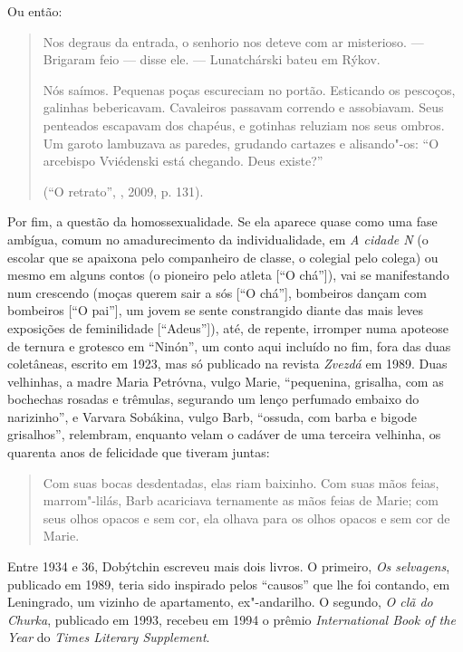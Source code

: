 Ou então:

\begin{quotation}
Nos degraus da entrada, o senhorio nos deteve com ar misterioso.
--- Brigaram feio --- disse ele. --- Lunatchárski bateu em Rýkov.

Nós saímos. Pequenas poças escureciam no portão. Esticando os pescoços,
galinhas bebericavam. Cavaleiros passavam correndo e assobiavam. Seus
penteados escapavam dos chapéus, e gotinhas reluziam nos seus ombros. Um
garoto lambuzava as paredes, grudando cartazes e alisando"-os: ``O
arcebispo Vviédenski está chegando. Deus existe?''

(``O retrato'', , 2009, p. 131).
\end{quotation}

Por fim, a questão da homossexualidade. Se ela aparece quase como uma
fase ambígua, comum no amadurecimento da individualidade, em \emph{A
cidade N} (o escolar que se apaixona pelo companheiro de classe, o
colegial pelo colega) ou mesmo em alguns contos (o pioneiro pelo
atleta [``O chá'']), vai se manifestando num crescendo (moças querem
sair a sós [``O chá''], bombeiros dançam com bombeiros [``O pai''], um
jovem se sente constrangido diante das mais leves exposições de
feminilidade [``Adeus'']), até, de repente, irromper numa apoteose de
ternura e grotesco em ``Ninón'', um conto aqui incluído no fim, fora das
duas coletâneas, escrito em 1923, mas só publicado na revista
\emph{Zvezdá} em 1989. Duas velhinhas, a madre Maria Petróvna, vulgo
Marie, ``pequenina, grisalha, com as bochechas rosadas e trêmulas,
segurando um lenço perfumado embaixo do narizinho'', e Varvara Sobákina,
vulgo Barb, ``ossuda, com barba e bigode grisalhos'', relembram,
enquanto velam o cadáver de uma terceira velhinha, os quarenta anos de
felicidade que tiveram juntas:

\begin{quotation}
Com suas bocas desdentadas, elas riam baixinho. Com suas mãos feias,
marrom"-lilás, Barb acariciava ternamente as mãos feias de Marie; com
seus olhos opacos e sem cor, ela olhava para os olhos opacos e sem cor
de Marie.
\end{quotation}

Entre 1934 e 36, Dobýtchin escreveu mais dois livros. O primeiro,
\emph{Os selvagens}, publicado em 1989, teria sido inspirado pelos
``causos'' que lhe foi contando, em Leningrado, um vizinho de
apartamento, ex"-andarilho. O segundo, \emph{O clã do Churka}, publicado
em 1993, recebeu em 1994 o prêmio \emph{International Book of the Year}
do \emph{Times Literary Supplement}.

